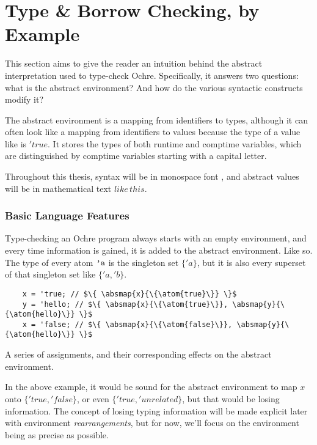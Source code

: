 \documentclass[12pt,twoside]{report}
\begin{document}
\cleardoublepage
\section{Type \& Borrow Checking, by Example}
\label{section:checkingexample}
This section aims to give the reader an intuition behind the abstract interpretation used to type-check Ochre. Specifically, it answers two questions: what is the abstract environment? And how do the various syntactic constructs modify it?

The abstract environment is a mapping from identifiers to types, although it can often look like a mapping from identifiers to values because the type of a value like  is $'true$. It stores the types of both runtime and comptime variables, which are distinguished by comptime variables starting with a capital letter.

Throughout this thesis, syntax will be in monospace font , and abstract values will be in mathematical text $like\,this$.

\subsubsection{Basic Language Features}
Type-checking an Ochre program always starts with an empty environment, and every time information is gained, it is added to the abstract environment. Like so. The type of every atom $\text{\texttt{'a}}$ is the singleton set $\{'a\}$, but it is also every superset of that singleton set like $\{'a, 'b\}$.

\begin{listing}[H]
  \begin{verbatim}
    x = 'true; // $\{ \absmap{x}{\{\atom{true}\}} \}$
    y = 'hello; // $\{ \absmap{x}{\{\atom{true}\}}, \absmap{y}{\{\atom{hello}\}} \}$
    x = 'false; // $\{ \absmap{x}{\{\atom{false}\}}, \absmap{y}{\{\atom{hello}\}} \}$
  \end{verbatim}
  \caption{A series of assignments, and their corresponding effects on the abstract environment.}
  \label{lst:atomabstract}
\end{listing}

In the above example, it would be sound for the abstract environment to map $x$ onto $\{'true, 'false\}$, or even $\{'true, 'unrelated\}$, but that would be losing information. The concept of losing typing information will be made explicit later with environment \textit{rearrangements}, but for now, we'll focus on the environment being as precise as possible.
\end{document}
